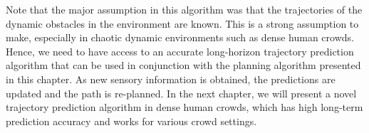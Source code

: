Note that the major assumption in this algorithm was that the trajectories of the dynamic obstacles in the environment are known. This is a strong assumption to make, especially in chaotic dynamic environments such as dense human crowds. Hence, we need to have access to an accurate long-horizon trajectory prediction algorithm that can be used in conjunction with the planning algorithm presented in this chapter. As new sensory information is obtained, the predictions are updated and the path is re-planned. In the next chapter, we will present a novel trajectory prediction algorithm in dense human crowds, which has high long-term prediction accuracy and works for various crowd settings.



